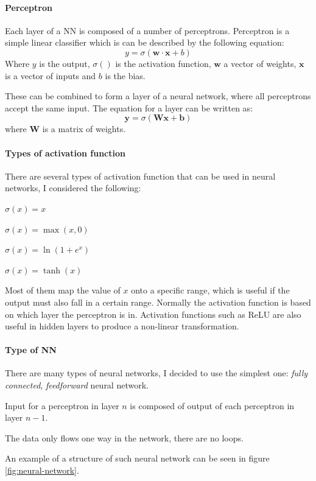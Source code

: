 \documentclass[12pt,a4paper]{book}
\newcommand\bs[1]{\boldsymbol{#1}}
\begin{document}
\paragraph{Perceptron}
Each layer of a NN is composed of a number of perceptrons.
Perceptron is a simple linear classifier which is can be described by the following equation:
\begin{equation*}
y = \sigma(\bs{w\cdot x}+b)
\end{equation*}
Where $y$ is the output, $\sigma()$ is the activation function, $\bs{w}$ a vector of weights, $\bs{x}$ is a vector of inputs and $b$ is the bias.

These can be combined to form a layer of a neural network, where all perceptrons accept the same input.
The equation for a layer can be written as:
\begin{equation*}
\bs{y} = \sigma(\bs{W}\bs{x}+\bs{b})
\end{equation*}
where $\bs{W}$ is a matrix of weights.

\paragraph{Types of activation function}
There are several types of activation function that can be used in neural networks, I considered the following:
\begin{description}[labelwidth=\widthof{\bfseries Rectified Linear Unit (ReLU) }]
\item[Identity] $\sigma(x) = x$
\item[Rectified Linear Unit (ReLU)] $\sigma(x) = \max(x,0)$
\item[Softplus] $\sigma(x) = \ln(1+e^x)$
\item[TanH] $\sigma(x) = \tanh(x)$
\end{description}
Most of them map the value of $x$ onto a specific range, which is useful if the output must also fall in a certain range.
Normally the activation function is based on which layer the perceptron is in.
Activation functions such as ReLU are also useful in hidden layers to produce a non-linear transformation.

\paragraph{Type of NN}
There are many types of neural networks, I decided to use the simplest one: \emph{fully connected}, \emph{feedforward} neural network.
\begin{description}[labelwidth=\widthof{\bfseries Fully connected }]
\item[Fully connected] Input for a perceptron in layer $n$ is composed of output of each perceptron in layer $n-1$.
\item[Feedforward] The data only flows one way in the network, there are no loops.
\end{description}
An example of a structure of such neural network can be seen in figure \ref{fig:neural-network}.
\end{document}
